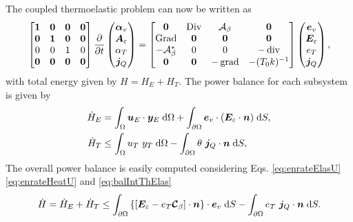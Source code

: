 The coupled thermoelastic problem can now be written as
\begin{equation}\label{eq:phsysElasHeat}
\begin{bmatrix}
\bm{1} & \bm{0} & \bm{0} & \bm{0}\\
\bm{0} & \bm{1} & \bm{0} & \bm{0}\\
0 & 0 & 1 & 0\\
\bm{0} & \bm{0} & \bm{0} & \bm{0}\\
\end{bmatrix}
\diffp{}{t}
\begin{pmatrix}
\bm{\alpha}_v \\
\bm{A}_\varepsilon \\
{\alpha}_T \\
\bm{j}_Q \\
\end{pmatrix} = 
\begin{bmatrix}
\bm{0} & \Div & \mathcal{A}_\beta & \bm{0}\\
\Grad & \bm{0} & \bm{0} & \bm{0} \\
- \mathcal{A}_\beta^* & 0 & 0 & -\div \\
\bm{0} & \bm{0} & -\grad & - (T_0 k)^{-1} \\
\end{bmatrix}
\begin{pmatrix}
\bm{e}_v \\
\bm{E}_\varepsilon \\
{e}_T \\
\bm{j}_Q \\
\end{pmatrix},
\end{equation}
with total energy given by $H=H_E + H_T$. The power balance for each subsystem is given by 
\begin{align}
\dot{H}_E &= \int_\Omega \bm{u}_E \cdot \bm{y}_E \d\Omega + \int_{\partial\Omega} \bm{e}_v \cdot (\bm{E}_\varepsilon \cdot \bm{n}) \d{S}, \label{eq:enrateElasU} \\
\dot{H}_T &\le \int_\Omega u_T \ y_T \d\Omega - \int_{\partial\Omega} \theta \ \bm{j}_Q \cdot \bm{n} \d{S}, \label{eq:enrateHeatU}
\end{align}
The overall power balance is easily computed considering Eqs. \eqref{eq:enrateElasU} \eqref{eq:enrateHeatU} and \eqref{eq:balIntThElas}
\begin{equation}\label{eq:enrateIntThElas}
\begin{aligned}
\dot{H} = \dot{H}_E + \dot{H}_T \le \int_{\partial \Omega} \left\{\left[\bm{E}_\varepsilon - e_T \bm{\mathcal{C}}_\beta \right] \cdot \bm{n}\right\}  \cdot \bm{e}_v  \d{S} - \int_{\partial\Omega} e_T \ \bm{j}_Q \cdot \bm{n} \d{S}.
\end{aligned}
\end{equation}
